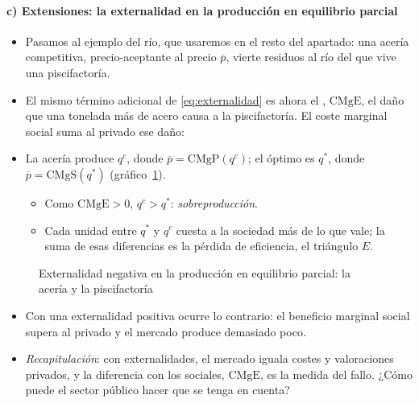 \documentclass[11pt]{article}
\begin{document}
\paragraph{c) Extensiones: la externalidad en la producción en equilibrio parcial}
\begin{itemize}
\item Pasamos al ejemplo del río, que usaremos en el resto del apartado: una acería competitiva, precio-aceptante al precio $\overline{p}$, vierte residuos al río del que vive una piscifactoría.
\item El mismo término adicional de \eqref{eq:externalidad} es ahora el , $\mathrm{CMgE}$, el daño que una tonelada más de acero causa a la piscifactoría. El coste marginal social suma al privado ese daño:
\item La acería produce $q^c$, donde $\overline{p}=\mathrm{CMgP}(q^c)$; el óptimo es $q^*$, donde $\overline{p}=\mathrm{CMgS}(q^*)$ (gráfico~\ref{fig:externalidad}).
  \begin{itemize}
  \item Como $\mathrm{CMgE}>0$, $q^c>q^*$: \emph{sobreproducción}.
  \item Cada unidad entre $q^*$ y $q^c$ cuesta a la sociedad más de lo que vale; la suma de esas diferencias es la pérdida de eficiencia, el triángulo $E$.
  \end{itemize}
\end{itemize}

\begin{figure}[H]
\centering
\caption{Externalidad negativa en la producción en equilibrio parcial: la acería y la piscifactoría}\label{fig:externalidad}
\end{figure}

\begin{itemize}
\item Con una externalidad positiva ocurre lo contrario: el beneficio marginal social supera al privado y el mercado produce demasiado poco.
\item \emph{Recapitulación}: con externalidades, el mercado iguala costes y valoraciones privados, y la diferencia con los sociales, $\mathrm{CMgE}$, es la medida del fallo. ¿Cómo puede el sector público hacer que se tenga en cuenta?
\end{itemize}
\end{document}
